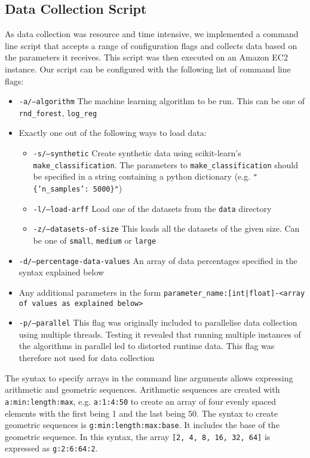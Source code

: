 \documentclass[a4paper,12pt,twoside,openright]{report}
\begin{document}
\subsection{Data Collection Script}
As data collection was resource and time intensive, we implemented a command line script that accepts a range of configuration flags and collects data based on the parameters it receives. This script was then executed on an Amazon EC2 instance. Our script can be configured with the following list of command line flags:

\begin{itemize}
\item \texttt{-a/--algorithm} The machine learning algorithm to be run. This can be one of \texttt{rnd\_forest}, \texttt{log\_reg}
\item Exactly one out of the following ways to load data:
\begin{itemize}[label=$\star$]
        \item \texttt{-s/--synthetic} Create synthetic data using scikit-learn's \texttt{make\_classification}. The parameters to \texttt{make\_classification} should be specified in a string containing a python dictionary (e.g. \texttt{"\{'n\_samples': 5000\}"})
        \item \texttt{-l/--load-arff} Load one of the datasets from the \texttt{data} directory
        \item \texttt{-z/--datasets-of-size} This loads all the datasets of the given size. Can be one of \texttt{small}, \texttt{medium} or \texttt{large}
     \end{itemize}
\item \texttt{-d/--percentage-data-values} An array of data percentages specified in the syntax explained below
\item Any additional parameters in the form \texttt{parameter\_name:[int|float]-<array of values as explained below>}
\item \texttt{-p/--parallel} This flag was originally included to parallelise data collection using multiple threads. Testing it revealed that running multiple instances of the algorithms in parallel led to distorted runtime data. This flag was therefore not used for data collection
\end{itemize}

The syntax to specify arrays in the command line arguments allows expressing arithmetic and geometric sequences. Arithmetic sequences are created with \texttt{a:min:length:max}, e.g. \texttt{a:1:4:50} to create an array of four evenly spaced elements with the first being 1 and the last being 50. The syntax to create geometric sequences is \texttt{g:min:length:max:base}. It includes the base of the geometric sequence. In this syntax, the array \texttt{[2, 4, 8, 16, 32, 64]} is expressed as \texttt{g:2:6:64:2}.
	
\end{document}

